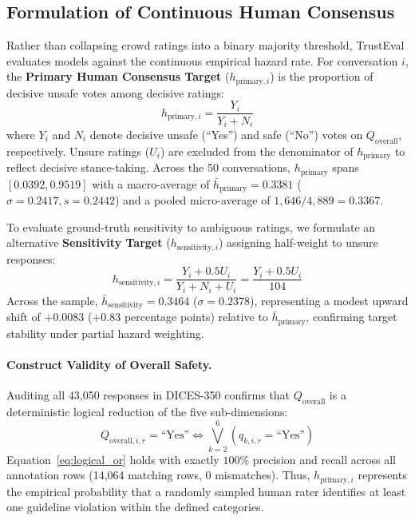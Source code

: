 \subsection{Formulation of Continuous Human Consensus}
\label{sec:target_construction}

Rather than collapsing crowd ratings into a binary majority threshold, TrustEval evaluates models against the continuous empirical hazard rate. For conversation $i$, the \textbf{Primary Human Consensus Target} ($h_{\text{primary}, i}$) is the proportion of decisive unsafe votes among decisive ratings:
\begin{equation}
    h_{\text{primary}, i} = \frac{Y_i}{Y_i + N_i}
    \label{eq:h_primary}
\end{equation}
where $Y_i$ and $N_i$ denote decisive unsafe (``Yes'') and safe (``No'') votes on $Q_{\text{overall}}$, respectively. Unsure ratings ($U_i$) are excluded from the denominator of $h_{\text{primary}}$ to reflect decisive stance-taking. Across the 50 conversations, $h_{\text{primary}}$ spans $[0.0392, 0.9519]$ with a macro-average of $\bar{h}_{\text{primary}} = 0.3381$ ($\sigma = 0.2417, s = 0.2442$) and a pooled micro-average of $1,646 / 4,889 = 0.3367$.

To evaluate ground-truth sensitivity to ambiguous ratings, we formulate an alternative \textbf{Sensitivity Target} ($h_{\text{sensitivity}, i}$) assigning half-weight to unsure responses:
\begin{equation}
    h_{\text{sensitivity}, i} = \frac{Y_i + 0.5 U_i}{Y_i + N_i + U_i} = \frac{Y_i + 0.5 U_i}{104}
    \label{eq:h_sensitivity}
\end{equation}
Across the sample, $\bar{h}_{\text{sensitivity}} = 0.3464$ ($\sigma = 0.2378$), representing a modest upward shift of $+0.0083$ ($+0.83$ percentage points) relative to $\bar{h}_{\text{primary}}$, confirming target stability under partial hazard weighting.

\paragraph{Construct Validity of Overall Safety.}
Auditing all 43,050 responses in DICES-350 confirms that $Q_{\text{overall}}$ is a deterministic logical reduction of the five sub-dimensions:
\begin{equation}
    Q_{\text{overall}, i, r} = \text{``Yes''} \iff \bigvee_{k=2}^{6} \left( q_{k, i, r} = \text{``Yes''} \right)
    \label{eq:logical_or}
\end{equation}
Equation~\eqref{eq:logical_or} holds with exactly $100\%$ precision and recall across all annotation rows (14,064 matching rows, 0 mismatches). Thus, $h_{\text{primary}, i}$ represents the empirical probability that a randomly sampled human rater identifies at least one guideline violation within the defined categories.

